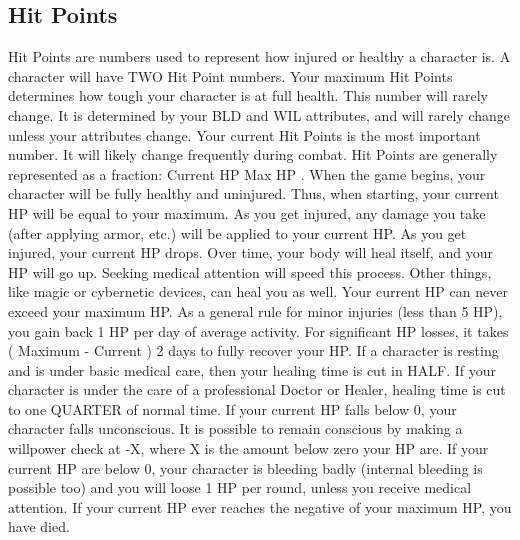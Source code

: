 \documentclass[twoside]{book}
\begin{document}
            
\subsection{Hit Points}
     Hit Points are numbers used to represent how injured
               or healthy a character is. A character will have TWO Hit
               Point numbers. Your maximum Hit Points determines how
               tough your character is at full health. This number will
               rarely change. It is determined by your BLD and WIL
               attributes, and will rarely change unless your attributes
               change.  Your current Hit Points is the most important number.
              It will likely change frequently during combat. Hit Points
              are generally represented as a fraction: 
              Current HP  Max HP  . When the
              game begins, your character will be fully healthy and
              uninjured. Thus, when starting, your current HP will be
              equal to your maximum.
             As you get injured, any damage you take (after
               applying armor, etc.) will be applied to your current HP.
               As you get injured, your current HP drops. Over time, your
               body will heal itself, and your HP will go up. Seeking
               medical attention will speed this process. Other things,
               like magic or cybernetic devices, can heal you as well.
                Your current HP can never exceed your maximum HP. As
               a general rule for minor injuries (less than 5 HP), you
               gain back 1 HP per day of average activity. For
               significant HP losses, it takes   
                         (    Maximum  
                      -    Current    )  
                        2 
                         days to fully recover your HP.
             If a character is resting and is under basic medical
               care, then your healing time is cut in HALF. If your
               character is under the care of a professional Doctor or
               Healer, healing time is cut to one QUARTER of normal time.
                If your current HP falls below 0, your character
               falls unconscious. It is possible to remain conscious by
               making a willpower check at -X, where X is the amount
               below zero your HP are. If your current HP are below 0,
               your character is bleeding badly (internal bleeding is
               possible too) and you will loose 1 HP per round, unless
               you receive medical attention. If your current HP ever
               reaches the negative of your maximum HP, you have died.
               
\end{document}
